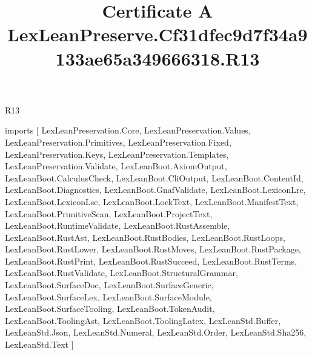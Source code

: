 \begin{lexlean}{R13}
\title{Certificate A LexLeanPreserve.Cf31dfec9d7f34a9133ae65a349666318.R13}
\begin{coremodule}
imports [
  LexLeanPreservation.Core,
  LexLeanPreservation.Values,
  LexLeanPreservation.Primitives,
  LexLeanPreservation.Fixed,
  LexLeanPreservation.Keys,
  LexLeanPreservation.Templates,
  LexLeanPreservation.Validate,
  LexLeanBoot.AxiomOutput,
  LexLeanBoot.CalculusCheck,
  LexLeanBoot.CliOutput,
  LexLeanBoot.ContentId,
  LexLeanBoot.Diagnostics,
  LexLeanBoot.GnafValidate,
  LexLeanBoot.LexiconLre,
  LexLeanBoot.LexiconLse,
  LexLeanBoot.LockText,
  LexLeanBoot.ManifestText,
  LexLeanBoot.PrimitiveScan,
  LexLeanBoot.ProjectText,
  LexLeanBoot.RuntimeValidate,
  LexLeanBoot.RustAssemble,
  LexLeanBoot.RustAst,
  LexLeanBoot.RustBodies,
  LexLeanBoot.RustLoops,
  LexLeanBoot.RustLower,
  LexLeanBoot.RustMoves,
  LexLeanBoot.RustPackage,
  LexLeanBoot.RustPrint,
  LexLeanBoot.RustSucceed,
  LexLeanBoot.RustTerms,
  LexLeanBoot.RustValidate,
  LexLeanBoot.StructuralGrammar,
  LexLeanBoot.SurfaceDoc,
  LexLeanBoot.SurfaceGeneric,
  LexLeanBoot.SurfaceLex,
  LexLeanBoot.SurfaceModule,
  LexLeanBoot.SurfaceTooling,
  LexLeanBoot.TokenAudit,
  LexLeanBoot.ToolingAst,
  LexLeanBoot.ToolingLatex,
  LexLeanStd.Buffer,
  LexLeanStd.Json,
  LexLeanStd.Numeral,
  LexLeanStd.Order,
  LexLeanStd.Sha256,
  LexLeanStd.Text
]


\end{coremodule}
\end{lexlean}
